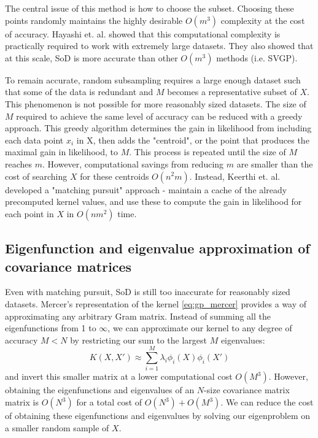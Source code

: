 The central issue of this method is how to choose the subset. Choosing these points randomly maintains the highly desirable $O(m^3)$ complexity at the cost of accuracy. Hayashi et. al. \cite{random-subsampling} showed that this computational complexity is practically required to work with extremely large datasets. They also showed that at this scale, SoD is more accurate than other $O(m^3)$ methods \cite{random-subsampling} (i.e. SVGP).

To remain accurate, random subsampling requires a large enough dataset such that some of the data is redundant and $M$ becomes a representative subset of $X$. This phenomenon is not possible for more reasonably sized datasets. The size of $M$ required to achieve the same level of accuracy can be reduced with a greedy approach. This greedy algorithm determines the gain in likelihood from including each data point $x_i$ in X, then adds the "centroid", or the point that produces the maximal gain in likelihood, to $M$. This process is repeated until the size of $M$ reaches $m$. However, computational savings from reducing $m$ are smaller than the cost of searching $X$ for these centroids $O(n^2m)$. Instead, Keerthi et. al. \cite{matching-pursuit} developed a "matching pursuit" approach - maintain a cache of the already precomputed kernel values, and use these to compute the gain in likelihood for each point in $X$ in $O(nm^2)$ time. 

\subsection{Eigenfunction and eigenvalue approximation of covariance matrices}
Even with matching pursuit, SoD is still too inaccurate for reasonably sized datasets. Mercer's representation of the kernel \ref{eq:gp_mercer} provides a way of approximating any arbitrary Gram matrix. Instead of summing all the eigenfunctions from 1 to $\infty$, we can approximate our kernel to any degree of accuracy $M < N$ by restricting our sum to the largest $M$ eigenvalues:
\begin{equation} \label{eq:gp_mercer_approx}
    K(X, X') \approx \sum_{i=1}^{M} \lambda_i \phi_i(X) \phi_i(X')
\end{equation}
and invert this smaller matrix at a lower computational cost $O(M^3)$. However, obtaining the eigenfunctions and eigenvalues of an $N$-size covariance matrix matrix is $O(N^3)$ for a total cost of $O(N^3) + O(M^3)$. We can reduce the cost of obtaining these eigenfunctions and eigenvalues by solving our eigenproblem on a smaller random sample of $X$. 

